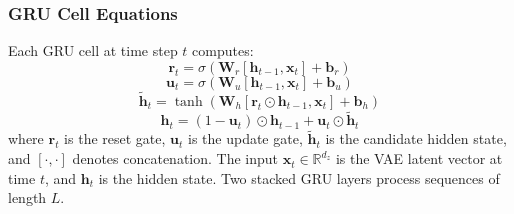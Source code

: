 \documentclass[journal]{IEEEtran}
\begin{document}
\subsubsection{GRU Cell Equations} Each GRU cell at time step $t$ computes:
\begin{equation}
    \mathbf{r}_t = \sigma(\mathbf{W}_r [\mathbf{h}_{t-1}, \mathbf{x}_t] + \mathbf{b}_r)
    \label{eq:gru_reset}
\end{equation}
\begin{equation}
    \mathbf{u}_t = \sigma(\mathbf{W}_u [\mathbf{h}_{t-1}, \mathbf{x}_t] + \mathbf{b}_u)
    \label{eq:gru_update}
\end{equation}
\begin{equation}
    \tilde{\mathbf{h}}_t = \tanh(\mathbf{W}_h [\mathbf{r}_t \odot \mathbf{h}_{t-1}, \mathbf{x}_t] + \mathbf{b}_h)
    \label{eq:gru_candidate}
\end{equation}
\begin{equation}
    \mathbf{h}_t = (1 - \mathbf{u}_t) \odot \mathbf{h}_{t-1} + \mathbf{u}_t \odot \tilde{\mathbf{h}}_t
    \label{eq:gru_output}
\end{equation}
where $\mathbf{r}_t$ is the reset gate, $\mathbf{u}_t$ is the update gate, $\tilde{\mathbf{h}}_t$ is the candidate hidden state, and $[\cdot, \cdot]$ denotes concatenation. The input $\mathbf{x}_t \in \mathbb{R}^{d_z}$ is the VAE latent vector at time $t$, and $\mathbf{h}_t$ is the hidden state. Two stacked GRU layers process sequences of length $L$.
\end{document}
